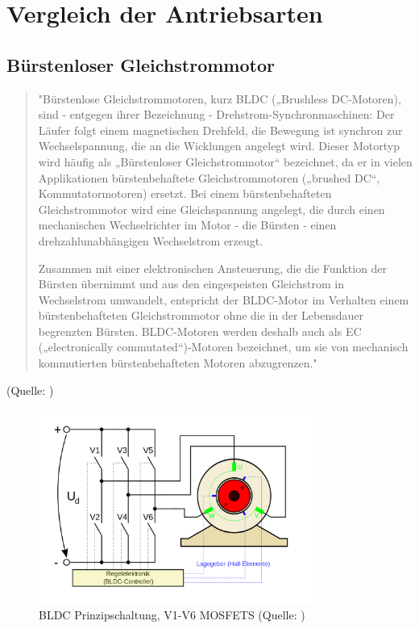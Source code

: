 \renewcommand{\autoren}{Severin Schendel	}
\newpage
\section{Vergleich der Antriebsarten}
\subsection{Bürstenloser Gleichstrommotor}
	
\begin{quote}
"Bürstenlose Gleichstrommotoren, kurz BLDC („Brushless DC-Motoren), sind -  entgegen ihrer Bezeichnung - Drehstrom-Synchronmaschinen: Der Läufer folgt einem magnetischen Drehfeld, die Bewegung ist synchron zur Wechselspannung, die an die Wicklungen angelegt wird. Dieser Motortyp wird häufig als „Bürstenloser Gleichstrommotor“ bezeichnet, da er in vielen Applikationen bürstenbehaftete Gleichstrommotoren („brushed DC“, Kommutatormotoren) ersetzt. Bei einem bürstenbehafteten Gleichstrommotor wird eine Gleichspannung angelegt, die durch einen mechanischen Wechselrichter im Motor - die Bürsten - einen drehzahlunabhängigen Wechselstrom erzeugt.

Zusammen mit einer elektronischen Ansteuerung, die die Funktion der Bürsten übernimmt und aus den eingespeisten Gleichstrom in Wechselstrom umwandelt, entspricht der BLDC-Motor im Verhalten einem bürstenbehafteten Gleichstrommotor ohne die in der Lebensdauer begrenzten Bürsten.  BLDC-Motoren werden deshalb auch als EC („electronically commutated“)-Motoren bezeichnet, um sie von mechanisch kommutierten bürstenbehafteten Motoren abzugrenzen."
\end{quote}
(Quelle: \cite{BLDCNanotec})
\begin{figure}[h]  %
\centering\includegraphics[width=0.8\textwidth]{images/BLDC_Prinzipschaltung}
\caption{BLDC Prinzipschaltung, V1-V6 MOSFETS \newline (Quelle: \cite{PrinzipBLDC})}
\label{PrinzipBLDC}
\end{figure}

